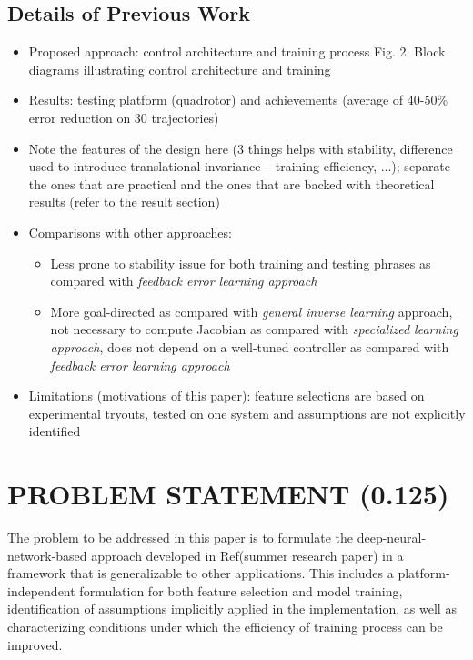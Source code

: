 \subsection{Details of Previous Work}
\label{subsec:previousWork}
\begin{itemize}
\item Proposed approach: control architecture and training process \color{blue}Fig. 2. Block diagrams illustrating control architecture and training\color{grey1}
\item Results: testing platform (quadrotor) and achievements (average of 40-50\% error reduction on 30 trajectories)
\item Note the features of the design here (3 things helps with stability, difference used to introduce translational invariance -- training efficiency, ...); separate the ones that are practical and the ones that are backed with theoretical results (refer to the result section)
\item Comparisons with other approaches:
\begin{itemize}
\item Less prone to stability issue for both training and testing phrases as compared with \textit{feedback error learning approach}
\item More goal-directed as compared with \textit{general inverse learning} approach, not necessary to compute Jacobian as compared with \textit{specialized learning approach}, does not depend on a well-tuned controller as compared with \textit{feedback error learning approach}
\end{itemize}
\item Limitations (motivations of this paper): feature selections are based on experimental tryouts, tested on one system and assumptions are not explicitly identified
\end{itemize}



\section{PROBLEM STATEMENT (0.125)}
The problem to be addressed in this paper is to formulate the deep-neural-network-based approach developed in Ref(summer research paper) in a framework that is generalizable to other applications. This includes a platform-independent formulation for both feature selection and model training, identification of assumptions implicitly applied in the implementation, as well as characterizing conditions under which the efficiency of training process can be improved. 

